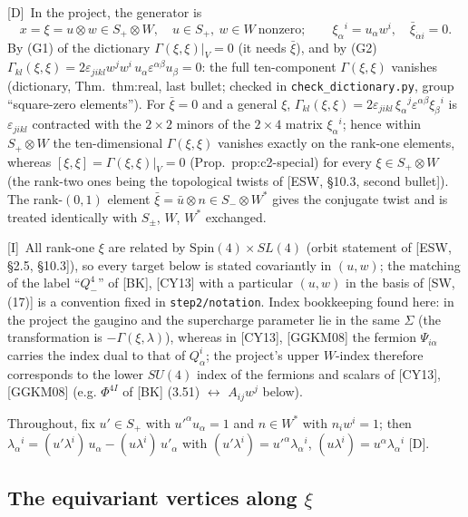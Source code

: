 \documentclass[11pt]{article}
\theoremstyle{definition}
\newcommand{\Dl}{\textup{[D]}}
\newcommand{\Il}{\textup{[I]}}
\begin{document}
\Dl\ In the project, the generator is
\[
x=\xi=u\otimes w\in S_+\otimes W,\quad u\in S_+,\ w\in W\ \text{nonzero};\qquad \xi_\alpha{}^i=u_\alpha w^i,\quad \bar\xi_{\dot\alpha i}=0 .
\]
By (G1) of the dictionary $\Gamma(\xi,\xi)|_V=0$ (it needs $\bar\xi$), and by (G2) $\Gamma_{kl}(\xi,\xi)=2\varepsilon_{jikl}w^jw^i\,u_\alpha\varepsilon^{\alpha\beta}u_\beta=0$: the full ten-component $\Gamma(\xi,\xi)$ vanishes (dictionary, Thm.~thm:real, last bullet; checked in \texttt{check\_dictionary.py}, group ``square-zero elements''). For $\bar\xi=0$ and a general $\xi$, $\Gamma_{kl}(\xi,\xi)=2\varepsilon_{jikl}\,\xi_\alpha{}^j\varepsilon^{\alpha\beta}\xi_\beta{}^i$ is $\varepsilon_{jikl}$ contracted with the $2\times2$ minors of the $2\times4$ matrix $\xi_\alpha{}^i$; hence within $S_+\otimes W$ the ten-dimensional $\Gamma(\xi,\xi)$ vanishes exactly on the rank-one elements, whereas $[\xi,\xi]=\Gamma(\xi,\xi)|_V=0$ (Prop.~prop:c2-special) for every $\xi\in S_+\otimes W$ (the rank-two ones being the topological twists of [ESW, \S10.3, second bullet]). The rank-$(0,1)$ element $\bar\xi=\bar u\otimes n\in S_-\otimes W^*$ gives the conjugate twist and is treated identically with $S_\pm$, $W$, $W^*$ exchanged.

\Il\ All rank-one $\xi$ are related by $\mathrm{Spin}(4)\times SL(4)$ (orbit statement of [ESW, \S2.5, \S10.3]), so every target below is stated covariantly in $(u,w)$; the matching of the label ``$Q^4_-$'' of [BK], [CY13] with a particular $(u,w)$ in the basis of [SW, (17)] is a convention fixed in \texttt{step2/notation}. Index bookkeeping found here: in the project the gaugino and the supercharge parameter lie in the same $\Sigma$ (the transformation is $-\Gamma(\xi,\lambda)$), whereas in [CY13], [GGKM08] the fermion $\Psi_{i\alpha}$ carries the index dual to that of $Q^i_\alpha$; the project's upper $W$-index therefore corresponds to the lower $SU(4)$ index of the fermions and scalars of [CY13], [GGKM08] (e.g. $\Phi^{4I}$ of [BK] (3.51) $\leftrightarrow$ $A_{ij}w^j$ below).

Throughout, fix $u'\in S_+$ with $u'^\alpha u_\alpha=1$ and $n\in W^*$ with $n_iw^i=1$; then $\lambda_\alpha{}^i=(u'\lambda^i)\,u_\alpha-(u\lambda^i)\,u'_\alpha$ with $(u'\lambda^i)=u'^\alpha\lambda_\alpha{}^i$, $(u\lambda^i)=u^\alpha\lambda_\alpha{}^i$ \Dl.

\subsection{The equivariant vertices along $\xi$}
\end{document}
